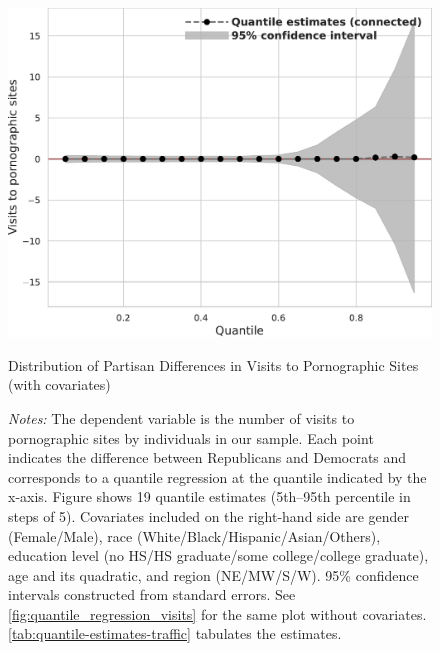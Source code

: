 \documentclass[12pt,twoside]{article}
\begin{document}
\begin{figure}
	\centering
	\includegraphics[width=.6\linewidth]{figs/quantile_reg_covariates_visits_adult.pdf}
	\caption{Distribution of Partisan Differences in Visits to Pornographic Sites (with covariates)}
	\caption*{\footnotesize \emph{Notes:} 
		The dependent variable is the number of visits to pornographic sites by individuals in our sample.
		Each point indicates the difference between Republicans and Democrats and corresponds to a quantile regression at the quantile indicated by the x-axis.
  Figure shows 19 quantile estimates (5th--95th percentile in steps of 5).
		Covariates included on the right-hand side are gender (Female/Male), race (White/Black/Hispanic/Asian/Others), education level (no HS/HS graduate/some college/college graduate), age and its quadratic, and region (NE/MW/S/W).
		95\% confidence intervals constructed from standard errors.
		See \cref{fig:quantile_regression_visits} for the same plot without covariates.
            \cref{tab:quantile-estimates-traffic} tabulates the estimates.
	}
	\label{fig:quantile_regression_visits_covariates}
\end{figure}
\end{document}
